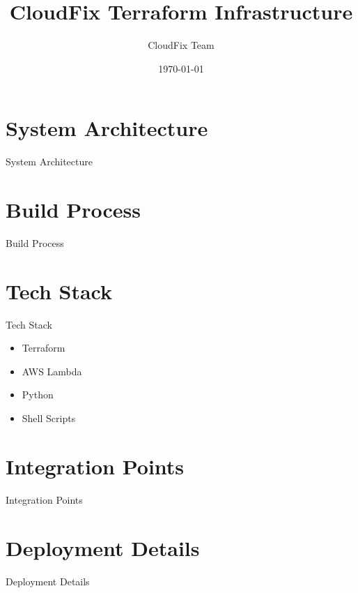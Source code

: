 \documentclass{beamer}
\title{CloudFix Terraform Infrastructure}
\author{CloudFix Team}
\date{\today}
\begin{document}
\frame{\titlepage}

\section{System Architecture}
\begin{frame}{System Architecture}
\end{frame}

\section{Build Process}
\begin{frame}{Build Process}
\end{frame}

\section{Tech Stack}
\begin{frame}{Tech Stack}
    \begin{itemize}
        \item Terraform
        \item AWS Lambda
        \item Python
        \item Shell Scripts
    \end{itemize}
\end{frame}

\section{Integration Points}
\begin{frame}{Integration Points}
\end{frame}

\section{Deployment Details}
\begin{frame}{Deployment Details}
\end{frame}
\end{document}

